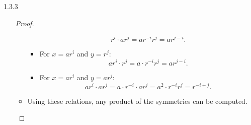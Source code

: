 \documentclass[12pt]{amsart}
\theoremstyle{definition}
\numberwithin{equation}{section}
\begin{document}
\begin{exercise}{1.3.3}
\begin{enumerate}[label=\alph*.]
\begin{proof}
\begin{itemize}[label=--]
\begin{itemize}[label=--]
                        \begin{equation*}
                        r^i \cdot ar^j = ar^{-i}r^j = ar^{j-i}.
                        \end{equation*}
                        \item For \(x = ar^i\) and \(y = r^j\):
                        \begin{equation*}
                        ar^i \cdot r^j = a \cdot r^{-i}r^j = ar^{j-i}.
                        \end{equation*}
                        \item For \(x = ar^i\) and \(y = ar^j\):
                        \begin{equation*}
                        ar^i \cdot ar^j = a \cdot r^{-i} \cdot ar^j = a^2 \cdot r^{-i}r^j = r^{-i+j}.
                        \end{equation*}
                    \end{itemize}
                    \item Using these relations, any product of the symmetries can be computed.
                \end{itemize}
            \end{proof}
            \end{enumerate}
        \end{exercise}
        
\end{document}
